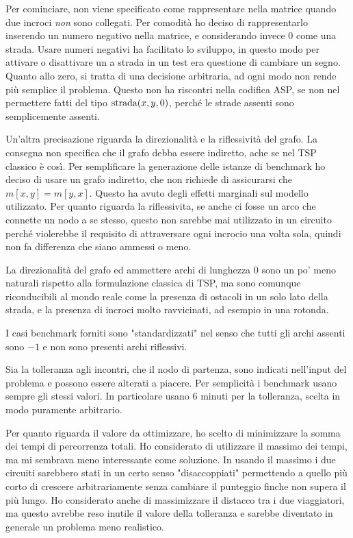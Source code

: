 \documentclass[12pt, a4paper]{article}
\begin{document}
Per cominciare, non viene specificato come rappresentare nella matrice quando due incroci \emph{non} sono collegati. Per comodità ho deciso di rappresentarlo inserendo un numero negativo nella matrice, e considerando invece $0$ come una strada.
Usare numeri negativi ha facilitato lo sviluppo, in questo modo per attivare o disattivare un a strada in un test era questione di cambiare un segno. Quanto allo zero, si tratta di una decisione arbitraria, ad ogni modo non rende più semplice il problema.
Questo non ha riscontri nella codifica ASP, se non nel permettere fatti del tipo $\text{\lstinline{strada}}(x,y,0)$, perché le strade assenti sono semplicemente assenti.

Un'altra precisazione riguarda la direzionalità e la riflessività del grafo. La consegna non specifica che il grafo debba essere indiretto, ache se nel TSP classico è così.
Per semplificare la generazione delle istanze di benchmark ho deciso di usare un grafo indiretto, che non richiede di assicurarsi che $m[x,y]=m[y,x]$. Questo ha avuto degli effetti marginali sul modello utilizzato.
Per quanto riguarda la riflessivita, se anche ci fosse un arco che connette un nodo a se stesso, questo non sarebbe mai utilizzato in un circuito perché violerebbe il requisito di attraversare ogni incrocio una volta sola, quindi non fa differenza che siano ammessi o meno.

La direzionalità del grafo ed ammettere archi di lunghezza $0$ sono un po' meno naturali rispetto alla formulazione classica di TSP, ma sono comunque riconducibili al mondo reale come la presenza di ostacoli in un solo lato della strada, e la presenza di incroci molto ravvicinati, ad esempio in una rotonda.

I casi benchmark forniti sono "standardizzati" nel senso che tutti gli archi assenti sono $-1$ e non sono presenti archi riflessivi.

Sia la tolleranza agli incontri, che il nodo di partenza, sono indicati nell'input del problema e possono essere alterati a piacere. Per semplicità i benchmark usano sempre gli stessi valori. In particolare usano $6$ minuti per la tolleranza, scelta in modo puramente arbitrario.

Per quanto riguarda il valore da ottimizzare, ho scelto di minimizzare la somma dei tempi di percorrenza totali.
Ho considerato di utilizzare il massimo dei tempi, ma mi sembrava meno interessante come soluzione. In usando il massimo i due circuiti sarebbero stati in un certo senso "disaccoppiati" permettendo a quello più corto di crescere arbitrariamente senza cambiare il punteggio finche non supera il più lungo.
Ho considerato anche di massimizzare il distacco tra i due viaggiatori, ma questo avrebbe reso inutile il valore della tolleranza e sarebbe diventato in generale un problema meno realistico.
\end{document}

